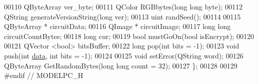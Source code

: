 \begin{DoxyCode}
00110     QByteArray ver\_byte;
00111     QColor RGBbytes(\textcolor{keywordtype}{long} \textcolor{keywordtype}{long} byte);
00112     QString generateVersionString(\textcolor{keywordtype}{long} ver);
00113     uint randSeed();
00114 
00115     QByteArray * circuitData;
00116     QImage * circuitImage;
00117     \textcolor{keywordtype}{long} \textcolor{keywordtype}{long} circuitCountBytes;
00118     \textcolor{keywordtype}{long} cur;
00119     \textcolor{keywordtype}{bool} mustGoOn(\textcolor{keywordtype}{bool} isEncrypt);
00120 
00121     QVector <bool> bitsBuffer;
00122     \textcolor{keywordtype}{long} pop(\textcolor{keywordtype}{int} bits = -1);
00123     \textcolor{keywordtype}{void} push(\textcolor{keywordtype}{int} \hyperlink{namespace_errors_dict_setup_adf4c30d205d29df7343e26f7c62b0685}{data}, \textcolor{keywordtype}{int} bits = -1);
00124 
00125     \textcolor{keywordtype}{void} setError(QString word);
00126     QByteArray GetRandomBytes(\textcolor{keywordtype}{long} \textcolor{keywordtype}{long} count = 32);
00127 \};
00128 
00129 \textcolor{preprocessor}{#endif // MODELPC\_H}
\end{DoxyCode}
